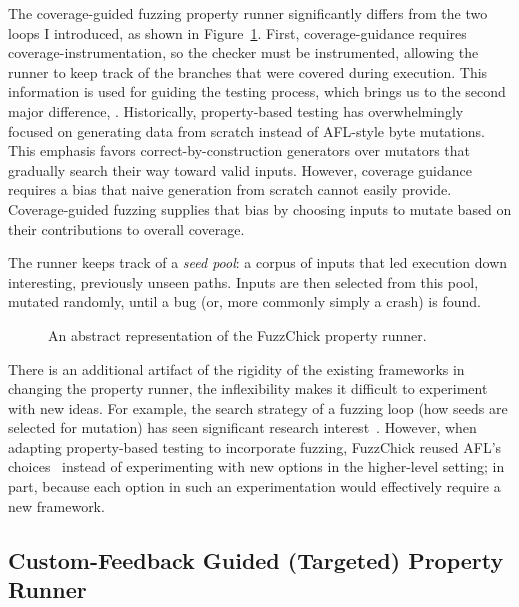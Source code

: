 The coverage-guided fuzzing property runner significantly differs from the two loops I
introduced, as shown in Figure~\ref{fig:fuzzing-property-runner}. First,
coverage-guidance requires coverage-instrumentation, so the checker must be
instrumented, allowing the runner to keep track of the branches that were covered
during execution. This information is used for guiding the testing process, which
brings us to the second major difference, . Historically,
property-based testing has overwhelmingly focused on generating data from scratch
instead of AFL-style byte mutations. This emphasis favors correct-by-construction
generators over mutators that gradually search their way toward valid inputs. However,
coverage guidance requires a bias that naive generation from scratch cannot easily
provide. Coverage-guided fuzzing supplies that bias by choosing inputs to mutate based
on their contributions to overall coverage.

The runner keeps track of a \emph{seed pool}: a corpus of inputs that led execution
down interesting, previously unseen paths. Inputs are then selected from this pool,
mutated randomly, until a bug (or, more commonly simply a crash) is found.

\begin{figure}[h!]
  \centering
  \resizebox{0.95\linewidth}{!}{}
  \caption{An abstract representation of the FuzzChick property runner.}
  \label{fig:fuzzing-property-runner}
\end{figure}

There is an additional artifact of the rigidity of the existing frameworks in changing
the property runner, the inflexibility makes it difficult to experiment with new ideas.
For example, the search strategy of a fuzzing loop (how seeds are selected for
mutation) has seen significant research
interest~\cite{DBLP:journals/tse/BohmePR19,FairFuzz,DirectedGreybox}. However, when
adapting property-based testing to incorporate fuzzing, FuzzChick reused AFL's
choices~\cite{FuzzChick} instead of experimenting with new options in the higher-level
setting; in part, because each option in such an experimentation would effectively
require a new framework.

\subsection{Custom-Feedback Guided (Targeted) Property Runner}\label{sec:loops:tpr}

